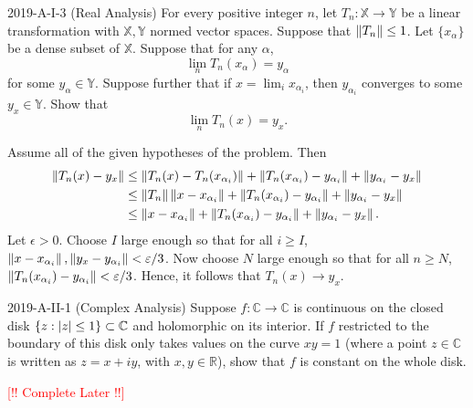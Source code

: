 \documentclass{article}
\begin{document}
\begin{prb}{2019-A-I-3 (Real Analysis)}
	For every positive integer $n$, let $T_{n}: \mathbb{X} \to \mathbb{Y}$ be a linear transformation with $\mathbb{X}, \mathbb{Y}$ normed vector spaces. Suppose that $\norm{T_{n}} \leq 1$. Let $\{x_{\alpha}\}$ be a dense subset of $\mathbb{X}$. Suppose that for any $\alpha$, 
		\begin{equation*}
			\lim_{n} T_{n}(x_{\alpha}) = y_{\alpha}
		\end{equation*}
	for some $y_{\alpha} \in \mathbb{Y}$. Suppose further that if $x = \lim_{i}x_{\alpha_{i}}$, then $y_{\alpha_{i}}$ converges to some $y_{x} \in \mathbb{Y}$. Show that $$\lim_{n}T_{n}(x) = y_{x}.$$ 
\end{prb}
\begin{solutions}
	Assume all of the given hypotheses of the problem. Then 
		\begin{align}
			\begin{split} 
				\norm{T_{n}(x) - y_{x}} &\leq \norm{T_{n}(x) - T_{n}(x_{\alpha_{i}})}  + \norm{T_{n}(x_{\alpha_{i}}) - y_{\alpha_{i}}} + \norm{y_{\alpha_{i}} - y_{x}}  \\
				&\leq \norm{T_{n}}\norm{x - x_{\alpha_{i}}} + \norm{T_{n}(x_{\alpha_{i}}) - y_{\alpha_{i}}} +  \norm{y_{\alpha_{i}} - y_{x}} \\
				&\leq \norm{x - x_{\alpha_{i}}} + \norm{T_{n}(x_{\alpha_{i}}) - y_{\alpha_{i}}} + \norm{y_{\alpha_{i}} - y_{x}}. 
			\end{split} 
		\end{align}
	Let $\epsilon > 0$. Choose $I$ large enough so that for all $i \geq I$, $\norm{x - x_{\alpha_{i}}}, \norm{y_{x} - y_{\alpha_{i}}} < \epsilon/3$. Now choose $N$ large enough so that for all $n\geq N$, $\norm{T_{n}(x_{\alpha_{i}}) - y_{\alpha_{i}}} < \epsilon/3$.  Hence, it follows that $T_{n}(x) \to y_{x}$. 
\end{solutions}
\begin{prb}{2019-A-II-1 (Complex Analysis)}
	Suppose $f: \mathbb{C} \to \mathbb{C}$ is continuous on the closed disk $\brac*{z: \abs{z}\leq 1} \subset \mathbb{C}$ and holomorphic on its interior. If $f$ restricted to the boundary of this disk only takes values on the curve $xy = 1$ (where a point $z \in \mathbb{C}$ is written as $z = x + iy$, with $x, y \in \mathbb{R}$), show that $f$ is constant on the whole disk. 
\end{prb}
\begin{solutions}
	\textcolor{red}{[!! Complete Later !!]}
\end{solutions}
\end{document}
